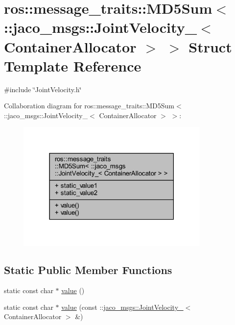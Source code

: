 \hypertarget{structros_1_1message__traits_1_1MD5Sum_3_01_1_1jaco__msgs_1_1JointVelocity___3_01ContainerAllocator_01_4_01_4}{}\section{ros\+:\+:message\+\_\+traits\+:\+:M\+D5\+Sum$<$ \+:\+:jaco\+\_\+msgs\+:\+:Joint\+Velocity\+\_\+$<$ Container\+Allocator $>$ $>$ Struct Template Reference}
\label{structros_1_1message__traits_1_1MD5Sum_3_01_1_1jaco__msgs_1_1JointVelocity___3_01ContainerAllocator_01_4_01_4}


{\ttfamily \#include \char`\"{}Joint\+Velocity.\+h\char`\"{}}



Collaboration diagram for ros\+:\+:message\+\_\+traits\+:\+:M\+D5\+Sum$<$ \+:\+:jaco\+\_\+msgs\+:\+:Joint\+Velocity\+\_\+$<$ Container\+Allocator $>$ $>$\+:
\nopagebreak
\begin{figure}[H]
\begin{center}
\leavevmode
\includegraphics[width=270pt]{d0/dbe/structros_1_1message__traits_1_1MD5Sum_3_01_1_1jaco__msgs_1_1JointVelocity___3_01ContainerAllocator_01_4_01_4__coll__graph}
\end{center}
\end{figure}
\subsection*{Static Public Member Functions}
\begin{DoxyCompactItemize}
\item 
static const char $\ast$ \hyperlink{structros_1_1message__traits_1_1MD5Sum_3_01_1_1jaco__msgs_1_1JointVelocity___3_01ContainerAllocator_01_4_01_4_a4ad10d062381a72fac6cfdc42fb46f02}{value} ()
\item 
static const char $\ast$ \hyperlink{structros_1_1message__traits_1_1MD5Sum_3_01_1_1jaco__msgs_1_1JointVelocity___3_01ContainerAllocator_01_4_01_4_a64924e93ecf648746b442fe22bbec68e}{value} (const \+::\hyperlink{structjaco__msgs_1_1JointVelocity__}{jaco\+\_\+msgs\+::\+Joint\+Velocity\+\_\+}$<$ Container\+Allocator $>$ \&)
\end{DoxyCompactItemize}
